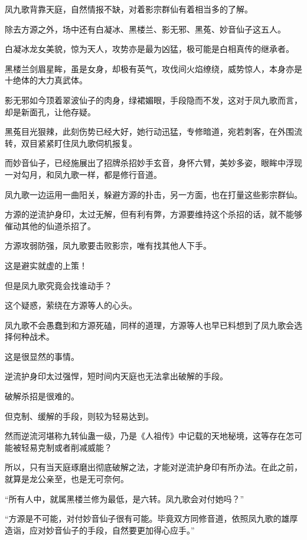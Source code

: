 
\begin{this_body}



凤九歌背靠天庭，自然情报不缺，对着影宗群仙有着相当多的了解。

除去方源之外，场中还有白凝冰、黑楼兰、影无邪、黑菟、妙音仙子这五人。

白凝冰龙女美貌，惊为天人，攻势亦是最为凶猛，极可能是白相真传的继承者。

黑楼兰剑眉星眸，虽是女身，却极有英气，攻伐间火焰缭绕，威势惊人，本身亦是十绝体的大力真武体。

影无邪如今顶着翠波仙子的肉身，绿裙媚眼，手段隐而不发，这对于凤九歌而言，却是新面孔，让他存疑。

黑菟目光狠辣，此刻伤势已经大好，她行动迅猛，专修暗道，宛若刺客，在外围流转，双目紧紧盯住凤九歌伺机报复。

而妙音仙子，已经施展出了招牌杀招妙手玄音，身怀六臂，美妙多姿，眼眸中浮现一对勾月，和凤九歌一样，都是修行音道。

凤九歌一边运用一曲阳关，躲避方源的扑击，另一方面，也在打量这些影宗群仙。

方源的逆流护身印，太过无解，但有利有弊，方源要维持这个杀招的话，就不能够催动其他的仙道杀招了。

方源攻弱防强，凤九歌要击败影宗，唯有找其他人下手。

这是避实就虚的上策！

但是凤九歌究竟会找谁动手？

这个疑惑，萦绕在方源等人的心头。

凤九歌不会愚蠢到和方源死磕，同样的道理，方源等人也早已料想到了凤九歌会选择何种战术。

这是很显然的事情。

逆流护身印太过强悍，短时间内天庭也无法拿出破解的手段。

破解杀招是很难的。

但克制、缓解的手段，则较为轻易达到。

然而逆流河堪称九转仙蛊一级，乃是《人祖传》中记载的天地秘境，这等存在怎可能被轻易克制或者削减威能？

所以，只有当天庭琢磨出彻底破解之法，才能对逆流护身印有所办法。在此之前，就算是龙公亲至，也是无可奈何。

“所有人中，就属黑楼兰修为最低，是六转。凤九歌会对付她吗？”

“方源是不可能，对付妙音仙子很有可能。毕竟双方同修音道，依照凤九歌的雄厚造诣，应对妙音仙子的手段，自然要更加得心应手。”


\end{this_body}
